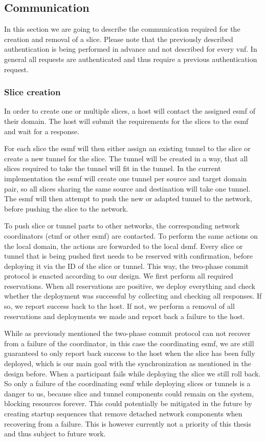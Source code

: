 \subsection{Communication}
\label{impl_communication}
In this section we are going to describe the communication required for the creation and removal of a slice. Please note that the previously described authentication is being performed in advance and not described for every \acrshort{vnf}. In general all requests are authenticated and thus require a previous authentication request.

\subsubsection{Slice creation}
In order to create one or multiple slices, a host will contact the assigned \acrshort{esmf} of their domain. The host will submit the requirements for the slices to the \acrshort{esmf} and wait for a response.

For each slice the \acrshort{esmf} will then either assign an existing tunnel to the slice or create a new tunnel for the slice. The tunnel will be created in a way, that all slices required to take the tunnel will fit in the tunnel. In the current implementation the \acrshort{esmf} will create one tunnel per source and target domain pair, so all slices sharing the same source and destination will take one tunnel. The \acrshort{esmf} will then attempt to push the new or adapted tunnel to the network, before pushing the slice to the network.

To push slice or tunnel parts to other networks, the corresponding network coordinators (\acrshort{ctmf} or other \acrshort{esmf}) are contacted. To perform the same actions on the local domain, the actions are forwarded to the local \acrshort{dsmf}. Every slice or tunnel that is being pushed first needs to be reserved with confirmation, before deploying it via the ID of the slice or tunnel. This way, the two-phase commit protocol is enacted according to our design. We first perform all required reservations. When all reservations are positive, we deploy everything and check whether the deployment was successful by collecting and checking all responses. If so, we report success back to the host. If not, we perform a removal of all reservations and deployments we made and report back a failure to the host.

While as previously mentioned the two-phase commit protocol can not recover from a failure of the coordinator, in this case the coordinating \acrshort{esmf}, we are still guaranteed to only report back success to the host when the slice has been fully deployed, which is our main goal with the synchronization as mentioned in the design before. When a participant fails while deploying the slice we still roll back. So only a failure of the coordinating \acrshort{esmf} while deploying slices or tunnels is a danger to us, because slice and tunnel components could remain on the system, blocking resources forever. This could potentially be mitigated in the future by creating startup sequences that remove detached network components when recovering from a failure. This is however currently not a priority of this thesis and thus subject to future work.


